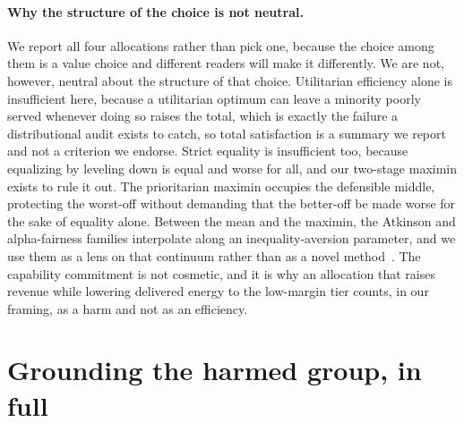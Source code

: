 \documentclass[manuscript, screen, review, anonymous]{acmart}
\begin{document}
\paragraph{Why the structure of the choice is not neutral.}
We report all four allocations rather than pick one, because the choice among them is a value choice and different readers will make it differently. We are not, however, neutral about the structure of that choice. Utilitarian efficiency alone is insufficient here, because a utilitarian optimum can leave a minority poorly served whenever doing so raises the total, which is exactly the failure a distributional audit exists to catch, so total satisfaction is a summary we report and not a criterion we endorse. Strict equality is insufficient too, because equalizing by leveling down is equal and worse for all, and our two-stage maximin exists to rule it out. The prioritarian maximin occupies the defensible middle, protecting the worst-off without demanding that the better-off be made worse for the sake of equality alone. Between the mean and the maximin, the Atkinson and alpha-fairness families interpolate along an inequality-aversion parameter, and we use them as a lens on that continuum rather than as a novel method~\cite{atkinson1970measurement,mo2000fair,moulin2003fair}. The capability commitment is not cosmetic, and it is why an allocation that raises revenue while lowering delivered energy to the low-margin tier counts, in our framing, as a harm and not as an efficiency.

\section{Grounding the harmed group, in full}
\label{app:grounding}
\end{document}
